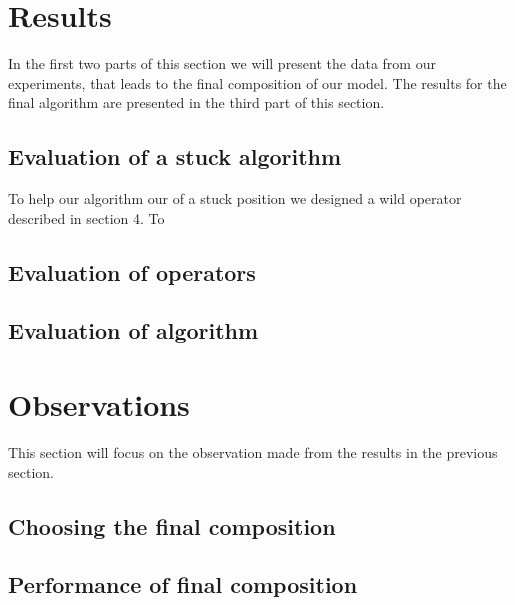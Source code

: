 \documentclass[../main.tex]{subfiles}
\begin{document}
\section{Results}
\label{sec:res}
In the first two parts of this section we will present the data from our experiments, that leads to the final composition of our model. The results for the final algorithm are presented in the third part of this section.

\subsection{Evaluation of a stuck algorithm}
\label{ssec:evals}
To help our algorithm our of a stuck position we designed a wild operator described in section 4. To 
\subsection{Evaluation of operators}
\label{ssec:evalo}

\subsection{Evaluation of algorithm}
\label{ssec:evala}

\section{Observations}
\label{sec:obs}
This section will focus on the observation made from the results in the previous section.

\subsection{Choosing the final composition}
\label{ssec:choosing}

\subsection{Performance of final composition}
\label{ssec:fincomp}

\biblio                                                         
\end{document}
